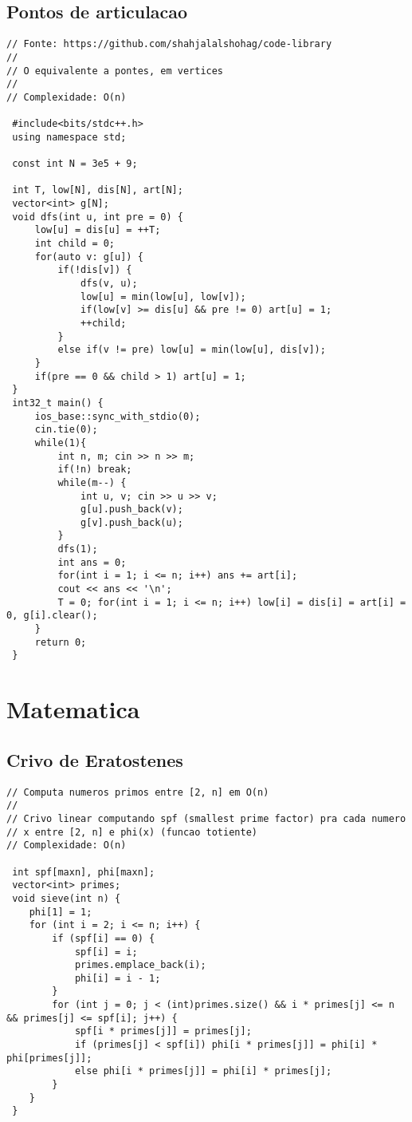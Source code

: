 \documentclass[11pt, a4paper, twoside]{article}
\begin{document}
\subsection{Pontos de articulacao}
\begin{lstlisting}
// Fonte: https://github.com/shahjalalshohag/code-library
//
// O equivalente a pontes, em vertices
//
// Complexidade: O(n)

 #include<bits/stdc++.h>
 using namespace std;
 
 const int N = 3e5 + 9;
 
 int T, low[N], dis[N], art[N];
 vector<int> g[N];
 void dfs(int u, int pre = 0) {
     low[u] = dis[u] = ++T;
     int child = 0;
     for(auto v: g[u]) {
         if(!dis[v]) {
             dfs(v, u);
             low[u] = min(low[u], low[v]);
             if(low[v] >= dis[u] && pre != 0) art[u] = 1;
             ++child;
         }
         else if(v != pre) low[u] = min(low[u], dis[v]);
     }
     if(pre == 0 && child > 1) art[u] = 1;
 }
 int32_t main() {
     ios_base::sync_with_stdio(0);
     cin.tie(0);
     while(1){
         int n, m; cin >> n >> m;
         if(!n) break;
         while(m--) {
             int u, v; cin >> u >> v;
             g[u].push_back(v);
             g[v].push_back(u);
         }
         dfs(1);
         int ans = 0;
         for(int i = 1; i <= n; i++) ans += art[i];
         cout << ans << '\n';
         T = 0; for(int i = 1; i <= n; i++) low[i] = dis[i] = art[i] = 0, g[i].clear();
     }
     return 0;
 }
\end{lstlisting}

\clearpage


%
%

\section{Matematica}

\subsection{Crivo de Eratostenes}
\begin{lstlisting}
// Computa numeros primos entre [2, n] em O(n)
//
// Crivo linear computando spf (smallest prime factor) pra cada numero
// x entre [2, n] e phi(x) (funcao totiente)
// Complexidade: O(n)

 int spf[maxn], phi[maxn];
 vector<int> primes;
 void sieve(int n) {
 	phi[1] = 1;
 	for (int i = 2; i <= n; i++) {
 		if (spf[i] == 0) {
 			spf[i] = i;
 			primes.emplace_back(i);
 			phi[i] = i - 1;
 		}
 		for (int j = 0; j < (int)primes.size() && i * primes[j] <= n && primes[j] <= spf[i]; j++) {
 			spf[i * primes[j]] = primes[j];
 			if (primes[j] < spf[i]) phi[i * primes[j]] = phi[i] * phi[primes[j]];
 			else phi[i * primes[j]] = phi[i] * primes[j];
 		}
 	}
 }
\end{lstlisting}
\end{document}
